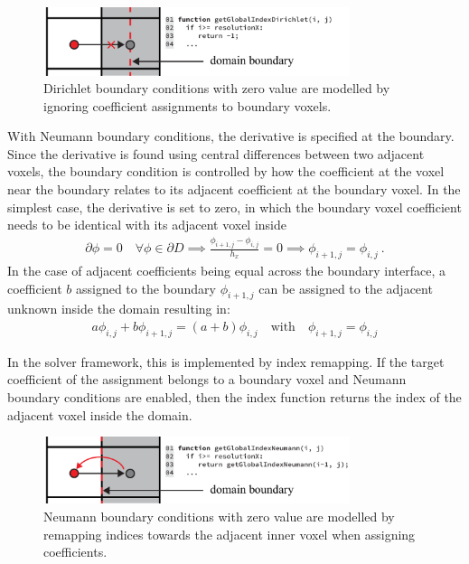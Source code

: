 \begin{figure}[h]
\centering
\includegraphics[width=0.8\textwidth]{04_pn_method/figures/fig_bc_dirichlet.pdf}
\caption{Dirichlet boundary conditions with zero value are modelled by ignoring coefficient assignments to boundary voxels.}
\label{fig:pn_bc_dirichlet}
\end{figure}

With Neumann boundary conditions, the derivative is specified at the boundary. Since the derivative is found using central differences between two adjacent voxels, the boundary condition is controlled by how the coefficient at the voxel near the boundary relates to its adjacent coefficient at the boundary voxel. In the simplest case, the derivative is set to zero, in which the boundary voxel coefficient needs to be identical with its adjacent voxel inside
\begin{align*}
\partial\phi=0\quad\forall\phi\in\partial D
\implies
\frac{\phi_{i+1,j}-\phi_{i,j}}{h_x} = 0
\implies
\phi_{i+1,j}=\phi_{i,j}
\ .
\end{align*}
In the case of adjacent coefficients being equal across the boundary interface, a coefficient $b$ assigned to the boundary $\phi_{i+1,j}$ can be assigned to the adjacent unknown inside the domain resulting in:
\begin{align}
a\phi_{i,j} + b\phi_{i+1,j} = \left(a+b\right)\phi_{i,j}
\quad \text{with}\quad \phi_{i+1,j}=\phi_{i,j}
\end{align}

In the solver framework, this is implemented by index remapping. If the target coefficient of the assignment belongs to a boundary voxel and Neumann boundary conditions are enabled, then the index function returns the index of the adjacent voxel inside the domain.

\begin{figure}[h]
\centering
\includegraphics[width=0.8\textwidth]{04_pn_method/figures/fig_bc_neumann.pdf}
\caption{Neumann boundary conditions with zero value are modelled by remapping indices towards the adjacent inner voxel when assigning coefficients.}
\label{fig:pn_bc_neumann}
\end{figure}

